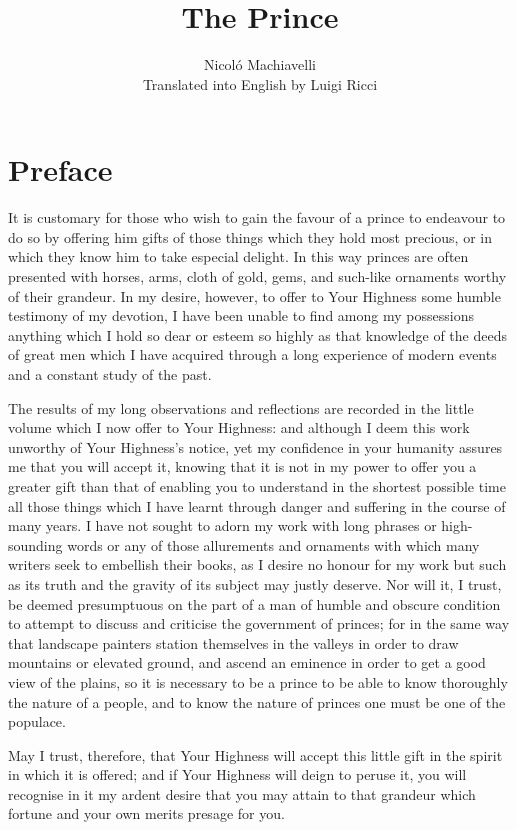 \documentclass[12pt,letterpaper]{memoir}
\title{\textbf{The Prince}}
\author{%
Nicoló Machiavelli\\
Translated into English by Luigi Ricci}
\date{}
\begin{document}
\frontmatter

\maketitle\newpage

\tableofcontents

\chapter{Preface}

It is customary for those who wish to gain the favour of a prince to
endeavour to do so by offering him gifts of those things which they
hold most precious, or in which they know him to take especial delight.
In this way princes are often presented with horses, arms, cloth of
gold, gems, and such-like ornaments worthy of their grandeur. In my
desire, however, to offer to Your Highness some humble testimony of
my devotion, I have been unable to find among my possessions anything
which I hold so dear or esteem so highly as that knowledge of the deeds
of great men which I have acquired through a long experience of modern
events and a constant study of the past.

The results of my long observations and reflections are recorded in the
little volume which I now offer to Your Highness: and although I deem
this work unworthy of Your Highness's notice, yet my confidence in your
humanity assures me that you will accept it, knowing that it is not
in my power to offer you a greater gift than that of enabling you to
understand in the shortest possible time all those things which I have
learnt through danger and suffering in the course of many years. I have
not sought to adorn my work with long phrases or high-sounding words or
any of those allurements and ornaments with which many writers seek to
embellish their books, as I desire no honour for my work but such as
its truth and the gravity of its subject may justly deserve. Nor will
it, I trust, be deemed presumptuous on the part of a man of humble and
obscure condition to attempt to discuss and criticise the government of
princes; for in the same way that landscape painters station themselves
in the valleys in order to draw mountains or elevated ground, and
ascend an eminence in order to get a good view of the plains, so it
is necessary to be a prince to be able to know thoroughly the nature
of a people, and to know the nature of princes one must be one of the
populace.

May I trust, therefore, that Your Highness will accept this little gift
in the spirit in which it is offered; and if Your Highness will deign
to peruse it, you will recognise in it my ardent desire that you may
attain to that grandeur which fortune and your own merits presage for
you.
\end{document}
